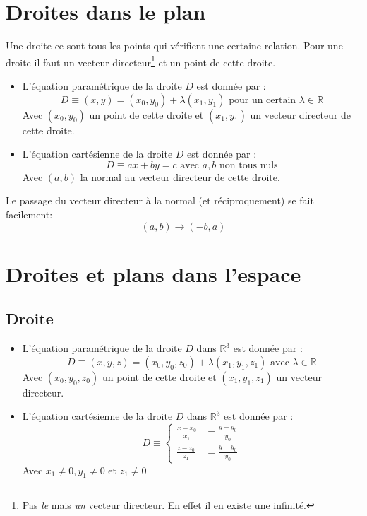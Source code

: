 \documentclass[a4paper,10pt]{report}
\begin{document}
\section{Droites dans le plan}
Une droite ce sont tous les points qui vérifient une certaine relation.
Pour une droite il faut un vecteur directeur\footnote{Pas \textit{le} mais \textit{un} vecteur directeur. En effet il en existe une infinité.} et un point de cette droite.

\begin{itemize}
\item{L'équation paramétrique de la droite $D$ est donnée par :
$$D \equiv (x,y) = (x_0, y_0) + \lambda (x_1, y_1) \mbox{ pour un certain } \lambda \in \mathbb{R}$$
Avec $(x_0, y_0)$ un point de cette droite et $(x_1, y_1)$ un vecteur directeur de cette droite.}

\item{L'équation cartésienne de la droite $D$ est donnée par :
$$D \equiv ax + by = c \mbox{ avec } a,b \mbox{ non tous nuls}$$
Avec $(a,b)$ la normal au vecteur directeur de cette droite.}
\end{itemize}

Le passage du vecteur directeur à la normal (et réciproquement) se fait facilement: 
$$(a,b) \rightarrow (-b,a)$$

\section{Droites et plans dans l'espace}
\subsection{Droite}
\begin{itemize}
\item{L'équation paramétrique de la droite $D$ dans $\mathbb{R}^3$ est donnée par :
$$D \equiv (x,y,z) = (x_0, y_0, z_0) + \lambda (x_1, y_1, z_1) \mbox{ avec } \lambda \in \mathbb{R}$$
Avec $(x_0, y_0, z_0)$ un point de cette droite et $(x_1, y_1, z_1)$ un vecteur directeur.}

\item{L'équation cartésienne de la droite $D$ dans $\mathbb{R}^3$ est donnée par :
$$D \equiv \left\{\begin{array}{ll}
 \frac{x-x_0}{x_1} & = \frac{y-y_0}{y_0}\\
 \frac{z-z_0}{z_1} & = \frac{y-y_0}{y_0}
 \end{array}\right.$$
Avec $x_1 \neq 0, y_1 \neq 0 \mbox{ et } z_1 \neq 0$
}
\end{itemize}
\end{document}

